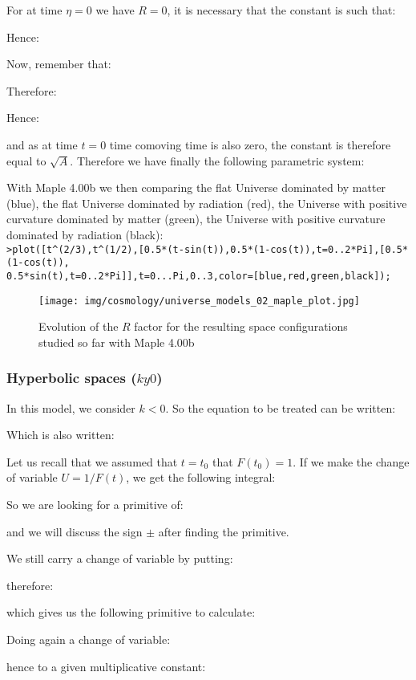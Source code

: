 	For at time $\eta=0$ we have $R=0$, it is necessary that the constant is such that:
	
	Hence:
	
	Now, remember that:
	
	Therefore:
	
	Hence:
	
	and as at time $t=0$ time comoving time is also zero, the constant is therefore equal to $\sqrt{A}$. Therefore we have finally the following parametric system:
	
	With Maple 4.00b we then comparing the flat Universe dominated by matter (blue), the flat Universe dominated by radiation (red), the Universe with positive curvature dominated by matter (green), the Universe with positive curvature dominated by radiation (black):\\
	
	\texttt{>plot([t\string^(2/3),t\string^(1/2),[0.5*(t-sin(t)),0.5*(1-cos(t)),t=0..2*Pi],[0.5*(1-cos(t)),\\0.5*sin(t),t=0..2*Pi]],t=0...Pi,0..3,color=[blue,red,green,black]);}
	\begin{figure}[H]
		\centering
		\texttt{[image: img/cosmology/universe\_models\_02\_maple\_plot.jpg]}
		\caption[]{Evolution of the $R$ factor for the resulting space configurations studied so far with Maple 4.00b}
	\end{figure}
	
	\subsubsection{Hyperbolic spaces ($ky0$)}
	In this model, we consider $k<0$. So the equation to be treated can be written:
	
	Which is also written:
	
	Let us recall that we assumed that $t=t_0$ that $F(t_0)=1$. If we make the change of variable $U=1/F(t)$, we get the following integral:
	
	So we are looking for a primitive of:
	
	and we will discuss the sign $\pm$ after finding the primitive.

	We still carry a change of variable by putting:
	
	 therefore:
	
	which gives us the following primitive to calculate:
	
	Doing again a change of variable:
	
	hence to a given multiplicative constant:
	
